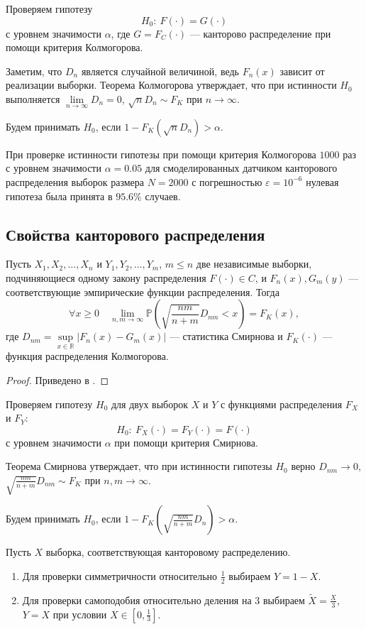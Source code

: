 \documentclass[11pt]{report}
\begin{document}
Проверяем гипотезу
$$
H_0:~F(\cdot)=G(\cdot)
$$
с уровнем значимости $\alpha$, где $G=F_C(\cdot)$ — канторово распределение при помощи критерия Колмогорова.

Заметим, что $D_n$ является случайной величиной, ведь $F_n(x)$ зависит от реализации выборки.
Теорема Колмогорова утверждает, что при истинности $H_0$ выполняется $\lim\limits_{n\to\infty} D_n = 0$, $\sqrt{n}D_n \sim F_K$ при $n\to\infty$.

Будем принимать $H_0$, если $1-F_K(\sqrt{n}D_n) > \alpha$.

При проверке истинности гипотезы при помощи критерия Колмогорова $1000$ раз с уровнем значимости $\alpha=0.05$ для смоделированных датчиком канторового распределения выборок размера $N=2000$ с погрешностью $\varepsilon=10^{-6}$ нулевая гипотеза была принята в $95.6\%$ случаев.

\subsection{Свойства канторового распределения}

\begin{theorem}[Смирнов] Пусть $X_1,X_2,\dots,X_n$ и $Y_1,Y_2,\dots,Y_m$, $m\leqslant n$ две независимые выборки, подчиняющиеся одному закону распределения $F(\cdot)\in C$, и $F_n(x),G_m(y)$ — соответствующие эмпирические функции распределения. Тогда
$$
\forall x\geqslant 0\quad \lim\limits_{n,m\to\infty}\mathbb{P}\left( \sqrt{\dfrac{nm}{n+m}}D_{nm} < x \right) = F_K(x),
$$
где $D_{nm} = \sup\limits_{x\in\mathbb{R}}|F_n(x) - G_m(x)|$ — статистика Смирнова и $F_K(\cdot)$ — функция распределения Колмогорова.
\end{theorem}
\begin{proof} Приведено в \cite{shiryaev-1}. \end{proof}

Проверяем гипотезу $H_0$ для двух выборок $X$ и $Y$ с функциями распределения $F_X$ и $F_Y$:
$$
H_0:~ F_X(\cdot) = F_Y(\cdot) = F(\cdot)
$$
с уровнем значимости $\alpha$ при помощи критерия Смирнова.

Теорема Смирнова утверждает, что при истинности гипотезы $H_0$ верно $D_{nm}\to0$, $\sqrt{\frac{nm}{n+m}}D_{nm}\sim F_K$ при $n,m\to\infty$.

Будем принимать $H_0$, если $1-F_K(\sqrt{\frac{nm}{n+m}}D_n) > \alpha$.

Пусть $X$  выборка, соответствующая канторовому распределению.
\begin{enumerate}
\item Для проверки симметричности относительно $\frac{1}{2}$ выбираем $Y=1-X$.
\item Для проверки самоподобия относительно деления на 3 выбираем $\tilde{X}=\frac{X}{3}$, $Y=X$ при условии $X\in[0,\frac{1}{3}]$.
\end{enumerate}
\end{document}
